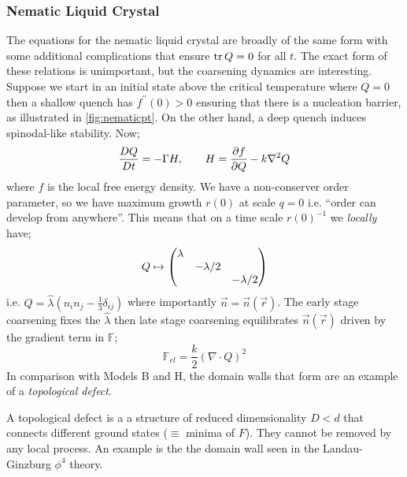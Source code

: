 \subsubsection{Nematic Liquid Crystal}
The equations for the nematic liquid crystal are broadly of the same form with some additional complications that ensure $\tr Q = 0$ for all $t$. The exact form of these relations is unimportant, but the coarsening dynamics are interesting. Suppose we start in an initial state above the critical temperature where $Q = 0$ then a shallow quench has $f^{\prime\prime}(0) > 0$ ensuring that there is a nucleation barrier, as illustrated in \autoref{fig:nematicpt}. On the other hand, a deep quench induces spinodal-like stability. Now;
\begin{equation*}
\frac{DQ}{Dt} = -\Gamma H, \qquad H = \frac{\partial f}{\partial Q} - k \nabla^2 Q
\end{equation*}
where $f$ is the local free energy density. We have a non-conserver order parameter, so we have maximum growth $r(0)$ at scale $q = 0$ i.e. ``order can develop from anywhere''. This means that on a time scale $r(0)^{-1}$ we \emph{locally} have;
\begin{equation*}
Q \mapsto \begin{pmatrix}\lambda&& \\ &-\lambda/2& \\ &&-\lambda/2\end{pmatrix}
\end{equation*}
i.e. $Q = \hat{\lambda}(n_i n_j - \tfrac{1}{3}\delta_{ij})$ where importantly $\vec{n} = \vec{n}(\vec{r})$. The early stage coarsening fixes the $\hat{\lambda}$ then late stage coarsening equilibrates $\vec{n}(\vec{r})$ driven by the gradient term in $\mathbb{F}$;
\begin{equation*}
\mathbb{F}_{el} = \frac{k}{2}(\nabla \cdot Q)^2
\end{equation*}
In comparison with Models B and H, the domain walls that form are an example of a \emph{topological defect}.
\begin{definitionbox}
A topological defect is a a structure of reduced dimensionality $D < d$ that connects different ground states ($\equiv$ minima of $F$). They cannot be removed by any local process. An example is the the domain wall seen in the Landau-Ginzburg $\phi^4$ theory.
\end{definitionbox}
